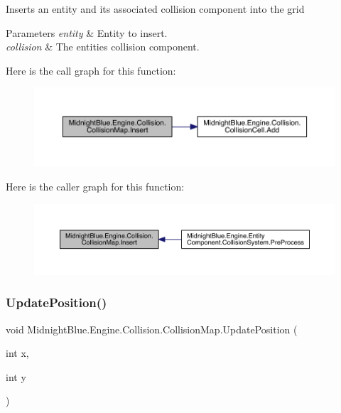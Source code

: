 Inserts an entity and its associated collision component into the grid 


\begin{DoxyParams}{Parameters}
{\em entity} & Entity to insert.\\
\hline
{\em collision} & The entities collision component.\\
\hline
\end{DoxyParams}
Here is the call graph for this function\+:
\nopagebreak
\begin{figure}[H]
\begin{center}
\leavevmode
\includegraphics[width=350pt]{class_midnight_blue_1_1_engine_1_1_collision_1_1_collision_map_ac5effff2c812f658296f7eb5d80b8baf_cgraph}
\end{center}
\end{figure}
Here is the caller graph for this function\+:
\nopagebreak
\begin{figure}[H]
\begin{center}
\leavevmode
\includegraphics[width=350pt]{class_midnight_blue_1_1_engine_1_1_collision_1_1_collision_map_ac5effff2c812f658296f7eb5d80b8baf_icgraph}
\end{center}
\end{figure}
\hypertarget{class_midnight_blue_1_1_engine_1_1_collision_1_1_collision_map_a7d387825607acea56ea40b3c84b34169}{}\label{class_midnight_blue_1_1_engine_1_1_collision_1_1_collision_map_a7d387825607acea56ea40b3c84b34169} 
\subsubsection{\texorpdfstring{Update\+Position()}{UpdatePosition()}}
{\footnotesize\ttfamily void Midnight\+Blue.\+Engine.\+Collision.\+Collision\+Map.\+Update\+Position (\begin{DoxyParamCaption}\item[{int}]{x,  }\item[{int}]{y }\end{DoxyParamCaption})\hspace{0.3cm}{\ttfamily [inline]}}



